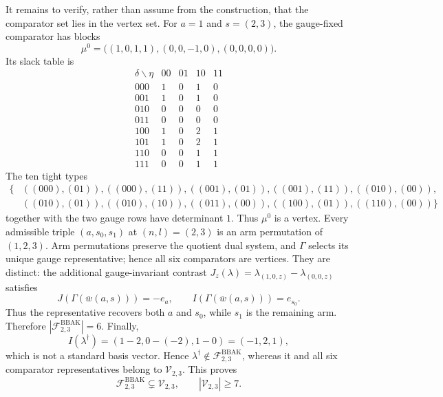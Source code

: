 It remains to verify, rather than assume from the construction, that the comparator set lies in the vertex set. For \(a=1\) and \(s=(2,3)\), the gauge-fixed comparator has blocks
\[
\mu^0=\bigl((1,0,1,1),(0,0,-1,0),(0,0,0,0)\bigr).
\]
Its slack table is
\[
\begin{array}{c|rrrr}
\delta\backslash\eta&00&01&10&11\\ \hline
000&1&0&1&0\\
001&1&0&1&0\\
010&0&0&0&0\\
011&0&0&0&0\\
100&1&0&2&1\\
101&1&0&2&1\\
110&0&0&1&1\\
111&0&0&1&1
\end{array}
\]
The ten tight types
\[
\begin{split}
\{&((000),(01)),((000),(11)),((001),(01)),((001),(11)),((010),(00)),\\
&((010),(01)),((010),(10)),((011),(00)),((100),(01)),((110),(00))\}
\end{split}
\]
together with the two gauge rows have determinant \(1\). Thus \(\mu^0\) is a vertex. Every admissible triple \((a,s_0,s_1)\) at \((n,l)=(2,3)\) is an arm permutation of \((1,2,3)\). Arm permutations preserve the quotient dual system, and \(\Gamma\) selects its unique gauge representative; hence all six comparators are vertices. They are distinct: the additional gauge-invariant contrast \(J_z(\lambda)=\lambda_{(1,0,z)}-\lambda_{(0,0,z)}\) satisfies
\[
J(\Gamma(\bar w(a,s)))=-e_a,\qquad I(\Gamma(\bar w(a,s)))=e_{s_0}.
\]
Thus the representative recovers both \(a\) and \(s_0\), while \(s_1\) is the remaining arm. Therefore \(|\mathcal F^{\mathrm{BBAK}}_{2,3}|=6\). Finally,
\[
I(\lambda^\dagger)=(1-2,0-(-2),1-0)=(-1,2,1),
\]
which is not a standard basis vector. Hence \(\lambda^\dagger\notin\mathcal F^{\mathrm{BBAK}}_{2,3}\), whereas it and all six comparator representatives belong to \(\mathcal V_{2,3}\). This proves
\[
\mathcal F^{\mathrm{BBAK}}_{2,3}\subsetneq\mathcal V_{2,3},\qquad |\mathcal V_{2,3}|\ge7.
\]